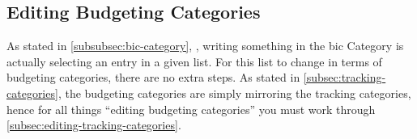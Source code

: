 \subsection{Editing Budgeting Categories}
\label{subsec:editing-categories-for-budgeting}

As stated in \autoref{subsubsec:bic-category}, , writing something in the \ac{bic} Category is actually selecting an entry in a given list.
For this list to change in terms of budgeting categories, there are no extra steps.
As stated in \autoref{subsec:tracking-categories}, the budgeting categories are simply mirroring the tracking categories, hence for all things ``editing budgeting categories'' you must work through \autoref{subsec:editing-tracking-categories}.